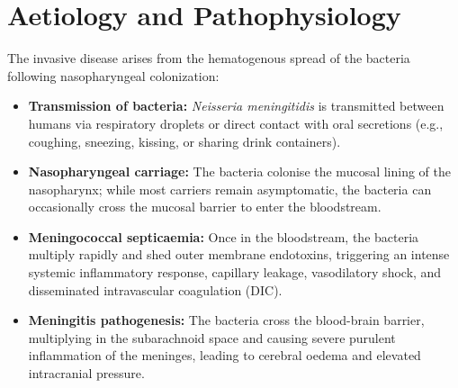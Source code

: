 \section*{Aetiology and Pathophysiology}
The invasive disease arises from the hematogenous spread of the bacteria following nasopharyngeal colonization:
\begin{itemize}
    \item \textbf{Transmission of bacteria:} \textit{Neisseria meningitidis} is transmitted between humans via respiratory droplets or direct contact with oral secretions (e.g., coughing, sneezing, kissing, or sharing drink containers).
    \item \textbf{Nasopharyngeal carriage:} The bacteria colonise the mucosal lining of the nasopharynx; while most carriers remain asymptomatic, the bacteria can occasionally cross the mucosal barrier to enter the bloodstream.
    \item \textbf{Meningococcal septicaemia:} Once in the bloodstream, the bacteria multiply rapidly and shed outer membrane endotoxins, triggering an intense systemic inflammatory response, capillary leakage, vasodilatory shock, and disseminated intravascular coagulation (DIC).
    \item \textbf{Meningitis pathogenesis:} The bacteria cross the blood-brain barrier, multiplying in the subarachnoid space and causing severe purulent inflammation of the meninges, leading to cerebral oedema and elevated intracranial pressure.
\end{itemize}

